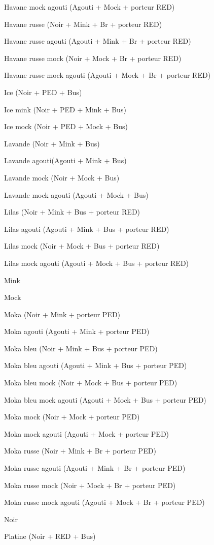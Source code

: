 \documentclass[a4paper,10pt]{article}
\begin{document}
Havane mock agouti (Agouti + Mock +   porteur RED)
 
Havane russe (Noir + Mink + Br + porteur   RED)
 
Havane russe agouti (Agouti + Mink + Br   + porteur RED)

Havane russe mock (Noir + Mock + Br + porteur RED)
 
Havane russe mock agouti (Agouti + Mock + Br + porteur RED)

Ice (Noir + PED + Bus)
 
Ice mink (Noir + PED + Mink + Bus)
 
Ice mock (Noir + PED + Mock + Bus)
 
Lavande (Noir + Mink + Bus)
 
Lavande agouti(Agouti + Mink + Bus)
 
Lavande mock (Noir + Mock + Bus)
 
Lavande mock agouti (Agouti + Mock + Bus)
 
Lilas (Noir + Mink + Bus + porteur RED)
 
Lilas agouti (Agouti + Mink + Bus +   porteur RED)
 
Lilas mock (Noir + Mock + Bus + porteur RED)

Lilas mock agouti (Agouti + Mock + Bus + porteur RED)
 
Mink
 
Mock
 
Moka (Noir + Mink + porteur PED)
 
Moka agouti (Agouti + Mink + porteur   PED)
 
Moka bleu (Noir + Mink + Bus + porteur   PED)
 
Moka bleu agouti (Agouti + Mink + Bus +   porteur PED)
 
Moka bleu mock (Noir + Mock + Bus + porteur PED)
 
Moka bleu mock agouti (Agouti + Mock +   Bus + porteur PED)
 
Moka mock (Noir + Mock + porteur PED)
 
Moka mock agouti (Agouti + Mock +   porteur PED)
 
Moka russe (Noir + Mink + Br + porteur  PED)
 
Moka russe agouti (Agouti + Mink + Br +  porteur PED)
 
Moka russe mock (Noir + Mock + Br + porteur PED)
 
Moka russe mock agouti (Agouti + Mock +  Br + porteur PED)
 
Noir
 
Platine (Noir + RED + Bus)
 
\end{document}
